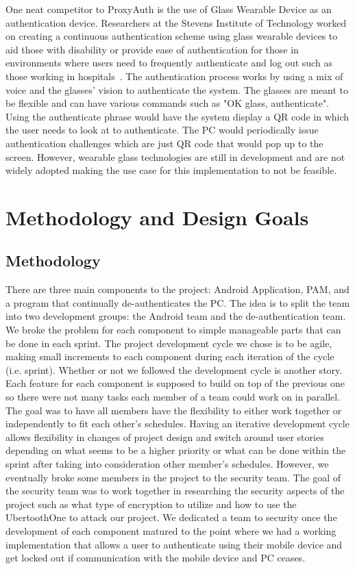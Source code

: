 \documentclass[letterpaper,twocolumn,10pt]{article}
\begin{document}
One neat competitor to ProxyAuth is the use of Glass Wearable Device as an authentication device. Researchers at the Stevens Institute of Technology worked on creating a continuous authentication scheme using glass wearable devices to aid those with disability or provide ease of authentication for those in environments where users need to frequently authenticate and log out such as those working in hospitals~\cite{paper_glasses}. The authentication process works by using a mix of voice and the glasses' vision to authenticate the system. The glasses are meant to be flexible and can have various commands such as "OK glass, authenticate". Using the authenticate phrase would have the system display a QR code in which the user needs to look at to authenticate. The PC would periodically issue authentication challenges which are just QR code that would pop up to the screen. However, wearable glass technologies are still in development and are not widely adopted making the use case for this implementation to not be feasible.

\label{Related Works}


\section{Methodology and Design Goals}
\subsection{Methodology}
There are three main components to the project: Android Application, PAM, and a program that continually de-authenticates the PC. The idea is to split the team into two development groups: the Android team and the de-authentication team. We broke the problem for each component to simple manageable parts that can be done in each sprint. The project development cycle we chose is to be agile, making small increments to each component during each iteration of the cycle (i.e. sprint). Whether or not we followed the development cycle is another story. Each feature for each component is supposed to build on top of the previous one so there were not many tasks each member of a team could work on in parallel. The goal was to have all members have the flexibility to either work together or independently to fit each other's schedules. Having an iterative development cycle allows flexibility in changes of project design and switch around user stories depending on what seems to be a higher priority or what can be done within the sprint after taking into consideration other member's schedules. However, we eventually broke some members in the project to the security team. The goal of the security team was to work together in researching the security aspects of the project such as what type of encryption to utilize and how to use the UbertoothOne to attack our project. We dedicated a team to security once the development of each component matured to the point where we had a working implementation that allows a user to authenticate using their mobile device and get locked out if communication with the mobile device and PC ceases.
\end{document}
